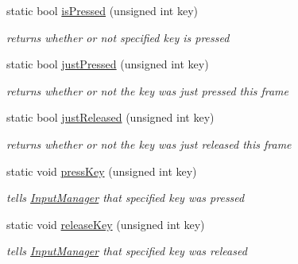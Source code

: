 \begin{DoxyCompactItemize}
\mbox{\label{classnta_1_1InputManager_ae97dfcf9043a3590a02387af85669871}} 
static bool \hyperlink{classnta_1_1InputManager_ae97dfcf9043a3590a02387af85669871}{is\+Pressed} (unsigned int key)
\begin{DoxyCompactList}\small\item\em returns whether or not specified key is pressed \end{DoxyCompactList}\item 
\mbox{\label{classnta_1_1InputManager_a63f1bc4d75790755fa260f273546630d}} 
static bool \hyperlink{classnta_1_1InputManager_a63f1bc4d75790755fa260f273546630d}{just\+Pressed} (unsigned int key)
\begin{DoxyCompactList}\small\item\em returns whether or not the key was just pressed this frame \end{DoxyCompactList}\item 
\mbox{\label{classnta_1_1InputManager_a2e4b4450234805eca3837bc8d365d0bc}} 
static bool \hyperlink{classnta_1_1InputManager_a2e4b4450234805eca3837bc8d365d0bc}{just\+Released} (unsigned int key)
\begin{DoxyCompactList}\small\item\em returns whether or not the key was just released this frame \end{DoxyCompactList}\item 
\mbox{\label{classnta_1_1InputManager_a190e5a8e2c26f28648538be7b4bea9e0}} 
static void \hyperlink{classnta_1_1InputManager_a190e5a8e2c26f28648538be7b4bea9e0}{press\+Key} (unsigned int key)
\begin{DoxyCompactList}\small\item\em tells \hyperlink{classnta_1_1InputManager}{Input\+Manager} that specified key was pressed \end{DoxyCompactList}\item 
\mbox{\label{classnta_1_1InputManager_acb2f11b5580141d4c3345499eea485c0}} 
static void \hyperlink{classnta_1_1InputManager_acb2f11b5580141d4c3345499eea485c0}{release\+Key} (unsigned int key)
\begin{DoxyCompactList}\small\item\em tells \hyperlink{classnta_1_1InputManager}{Input\+Manager} that specified key was released \end{DoxyCompactList}\item 

\end{DoxyCompactItemize}
